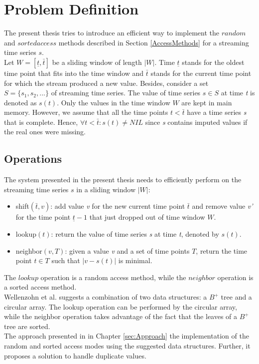 \documentclass[abstracton,12pt]{scrreprt}
\begin{document}
\chapter{Problem Definition}
The present thesis tries to introduce an efficient way to implement the $random$ and $sorted access$ methods described in Section \ref{AccessMethods} for a streaming time series $s$.\\
Let $W=[ \underline{t}, \bar{t} ]$ be a sliding window of length $|W|$. Time $\underline{t}$ stands for the oldest time point that fits into the time window and $\bar{t}$ stands for the current time point for which the stream produced a new value. Besides, consider a set $S = \{s_1,s_2,...\}$ of streaming time series. The value of time series $s \in S$ at time \emph{t} is denoted as $s(t)$. Only the values in the time window $W$ are kept in main memory. However, we assume that all the time points $t < \bar{t}$ have a time series \emph{s} that is complete. Hence, $\forall t < \bar{t} : s(t) \ne NIL$ since \emph{s} contains imputed values if the real ones were missing. 

\section{Operations}
\label{sec:Op}
The system presented in the present thesis needs to efficiently perform on the streaming time series $s$ in a sliding window $|W|$: 
\begin{itemize}  
	\item shift$(\bar{t}, v)$: add value \emph{v} for the new current time point $\bar{t}$ and remove value \emph{v'} for the time point $\underline{t} - 1$ that just dropped out of time window $W$.
	\item lookup$(t)$: return the value of time series \emph{s} at time \emph{t}, denoted by $s(t)$.
	\item neighbor$(v, T)$: given a value \emph{v} and a set of time points $T$, return the time point $t \in T$ such that $|v-s(t)|$ is minimal.
\end{itemize}
The $lookup$ operation is a random access method, while the $neighbor$ operation is a sorted access method.\\
Wellenzohn et al.\cite{BScT} suggests a combination of two data structures: a $B^+$ tree and a circular array. The lookup operation can be performed by the circular array, while the neighbor operation takes advantage of the fact that the leaves of a $B^+$ tree are sorted.\\
The approach presented in in Chapter \ref{sec:Approach} the implementation of the random and sorted access modes using the suggested data structures. Further, it proposes a solution to handle duplicate values. 
\end{document}
